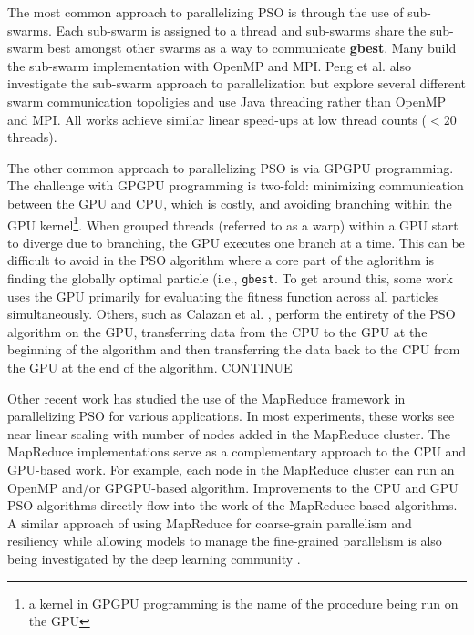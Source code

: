 The most common approach to parallelizing PSO is through the use of
sub-swarms. Each sub-swarm is assigned to a thread and sub-swarms share the
sub-swarm best amongst other swarms as a way to communicate
\textbf{gbest}. Many \cite{cooppso, comppso, optionpso}
build the sub-swarm implementation with OpenMP and MPI. Peng et
al. \cite{multicore-pso} also investigate the sub-swarm approach to
parallelization but explore several different swarm communication topoligies and
use Java threading rather than OpenMP and MPI. All works achieve similar linear
speed-ups at low thread counts ($<20$ threads).

The other common approach to parallelizing PSO is via GPGPU programming. The
challenge with GPGPU programming is two-fold: minimizing communication between
the GPU and CPU, which is costly, and avoiding branching within the GPU
kernel\footnote{a kernel in GPGPU programming is the name of the procedure being
  run on  the GPU}. When grouped threads (referred to as a warp) within a GPU
start to diverge due to branching, the
GPU executes one branch at a time.
This can be difficult to avoid in the PSO algorithm where a core part
of the aglorithm is finding the globally optimal particle (i.e., \texttt{gbest}.
To get around this,
some work \cite{gpu-ppso, gpu-pso} uses the GPU primarily for evaluating the
fitness function across all particles simultaneously.
Others, such as Calazan et al. \cite{swarmgrid}, perform the entirety of
the PSO algorithm on the GPU, transferring data from the CPU to the GPU at the
beginning of the algorithm and then transferring the data back to the CPU from
the GPU at the end of the algorithm.
CONTINUE \cite{biopsogpu, multiswarmpso-gpu}

Other recent work \cite{mrcpso, mprso, coop-pso, intrusion-pso} has
studied the use of the MapReduce framework \cite{mapreduce} in parallelizing PSO
for various applications. In most experiments, these works see near linear
scaling with number of nodes added in the MapReduce cluster.
The MapReduce implementations serve as a complementary
approach to the CPU and GPU-based work. For example, each node in the MapReduce
cluster can run an OpenMP and/or
GPGPU-based algorithm. Improvements to the CPU and GPU PSO algorithms directly
flow into the work of the MapReduce-based algorithms. A similar approach of using
MapReduce for coarse-grain parallelism and resiliency while allowing
models to manage the fine-grained
parallelism is also being investigated by the deep learning community \cite{mrpnn,
  heterospark, dlspark}. 

